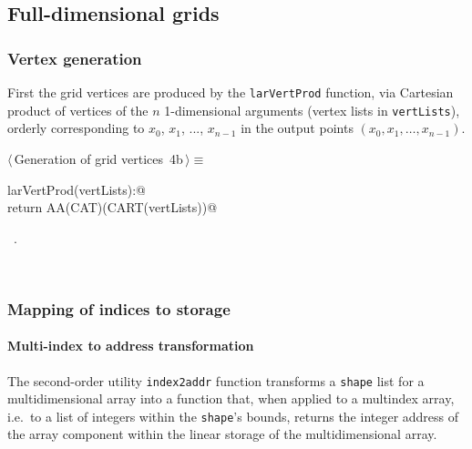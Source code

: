 \documentclass[11pt,oneside]{article}	%
\begin{document}
\subsection{Full-dimensional grids}

\subsubsection{Vertex generation}

First the grid vertices are produced by the \texttt{larVertProd} function, via Cartesian product of vertices of the $n$ 1-dimensional arguments (vertex lists in \texttt{vertLists}), orderly corresponding to $x_0$, $x_1$, ..., $x_{n-1}$ in the output points $(x_0, x_1,\ldots,x_{n-1})$.
\begin{flushleft} \small
\begin{minipage}{\linewidth} \label{scrap5}
\protect{}$\langle\,$Generation of grid vertices\nobreak\ {\footnotesize 4b}$\,\rangle\equiv$
\vspace{-1ex}
\begin{list}{}{} \item
\mbox{}\verb@def larVertProd(vertLists):@\\
\mbox{}\verb@    return AA(CAT)(CART(vertLists))@\\
\mbox{}\verb@@{\NWsep}
\end{list}
\vspace{-1ex}
\footnotesize\addtolength{\baselineskip}{-1ex}
\begin{list}{}{\setlength{\itemsep}{-\parsep}\setlength{\itemindent}{-\leftmargin}}
\item \NWtxtMacroRefIn\ .
\end{list}
\end{minipage}\\[4ex]
\end{flushleft}


\subsubsection{Mapping of indices to storage}

\paragraph{Multi-index to address transformation}
The second-order utility \texttt{index2addr} function transforms a \texttt{shape} list for a multidimensional array into a function that, when applied to a multindex array, i.e.~to a list of integers within the \texttt{shape}'s bounds, returns the integer address of the array component within the linear storage of the multidimensional array.
\end{document}
